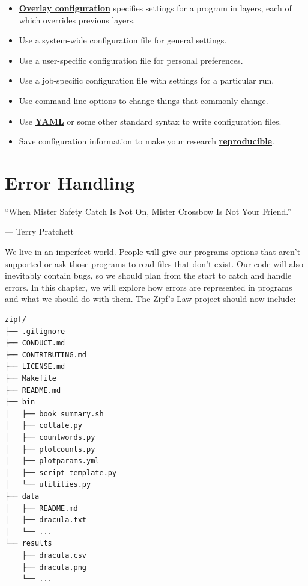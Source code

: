 \documentclass[
]{krantz}
\providecommand{\tightlist}{%
  \setlength{\itemsep}{0pt}\setlength{\parskip}{0pt}}
\renewenvironment{quote}{\begin{VF}}{\end{VF}}
\newcommand{\gref}[2]{\hyperlink{#2}{\textbf{#1}}}
\begin{document}
\begin{itemize}
\tightlist
\item
  \gref{Overlay configuration}{overlay\_configuration} specifies settings for a program in layers,
  each of which overrides previous layers.
\item
  Use a system-wide configuration file for general settings.
\item
  Use a user-specific configuration file for personal preferences.
\item
  Use a job-specific configuration file with settings for a particular run.
\item
  Use command-line options to change things that commonly change.
\item
  Use \gref{YAML}{yaml\_glossary} or some other standard syntax to write configuration files.
\item
  Save configuration information to make your research \gref{reproducible}{reproducible\_research}.
\end{itemize}

\hypertarget{errors}{%
\chapter{Error Handling}\label{errors}}

\begin{quote}
``When Mister Safety Catch Is Not On, Mister Crossbow Is Not Your Friend.''

--- Terry Pratchett
\end{quote}

We live in an imperfect world.
People will give our programs options that aren't supported
or ask those programs to read files that don't exist.
Our code will also inevitably contain bugs,
so we should plan from the start to catch and handle errors.
In this chapter,
we will explore how errors are represented in programs
and what we should do with them.
The Zipf's Law project should now include:

\begin{verbatim}
zipf/
├── .gitignore
├── CONDUCT.md
├── CONTRIBUTING.md
├── LICENSE.md
├── Makefile
├── README.md
├── bin
│   ├── book_summary.sh
│   ├── collate.py
│   ├── countwords.py
│   ├── plotcounts.py
│   ├── plotparams.yml
│   ├── script_template.py
│   └── utilities.py
├── data
│   ├── README.md
│   ├── dracula.txt
│   └── ...
└── results
    ├── dracula.csv
    ├── dracula.png
    └── ...
\end{verbatim}
\end{document}
